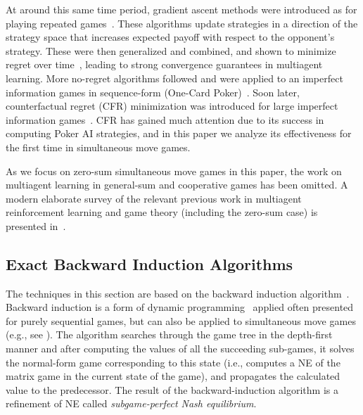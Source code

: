 At around this same time period, gradient ascent methods were introduced as for playing 
repeated games~\cite{Singh20Nash,Bowling01WoLF}. These algorithms update strategies in a direction of the strategy space 
that increases expected payoff with respect to the opponent's strategy. These were then generalized and combined, and 
shown to minimize regret over time~\cite{Zinkevich03Online,Bowling05Convergence}, leading to strong convergence 
guarantees in multiagent learning. More no-regret algorithms followed and were applied to an imperfect information 
games in sequence-form (One-Card Poker)~\cite{Gordon06No}. Soon later, counterfactual regret (CFR) minimization was 
introduced for large imperfect information games~\cite{CFR}. CFR has gained much attention due to its success in 
computing Poker AI strategies, and in this paper we analyze its effectiveness for the first time in simultaneous 
move games. 

As we focus on zero-sum simultaneous move games in this paper, the work on multiagent learning in general-sum and 
cooperative games has been omitted. A modern elaborate survey of the relevant previous work in multiagent 
reinforcement learning and game theory (including the zero-sum case) is presented in~\cite{Nowe12MARLchapter}. 

\subsection{Exact Backward Induction Algorithms}

The techniques in this section are based on the backward induction algorithm~\cite{Shoham09}.
Backward induction is a form of dynamic programming~\cite{Bellman57} applied often presented for purely sequential games, 
but can also be applied to simultaneous move games (e.g., see \cite{Ross71Goofspiel,buro2003,Rhoads12Computer}). 
The algorithm searches through the game tree in the depth-first manner and after computing the values of all the succeeding sub-games, it solves the normal-form game corresponding to this state (i.e., computes a NE of the matrix game in the current state of the game), and propagates the calculated value to the predecessor. The result of the backward-induction algorithm is a refinement of NE called \emph{subgame-perfect Nash equilibrium}. 

